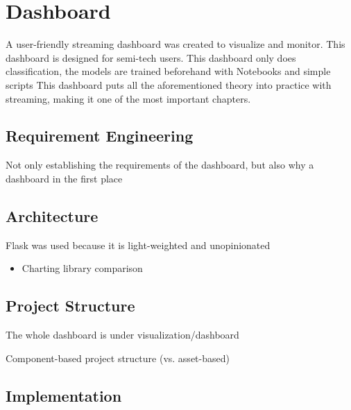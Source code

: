 \chapter{Dashboard}

\label{ch:dashboard}

A user-friendly streaming dashboard was created to visualize and monitor.
This dashboard is designed for semi-tech users.
This dashboard only does classification, the models are trained beforehand with Notebooks and simple scripts
This dashboard puts all the aforementioned theory into practice with streaming, making it one of the most important chapters.

\section{Requirement Engineering}
\label{sec:requirementEngineering}

Not only establishing the requirements of the dashboard, but also why a dashboard in the first place

\section{Architecture}
\label{sec:architecture}

Flask was used because it is light-weighted and unopinionated

\begin{itemize}
    \item
    Charting library comparison
\end{itemize}

\section{Project Structure}
\label{sec:projectStructure}

The whole dashboard is under visualization/dashboard

Component-based project structure (vs. asset-based)

\section{Implementation}
\label{sec:implementation}